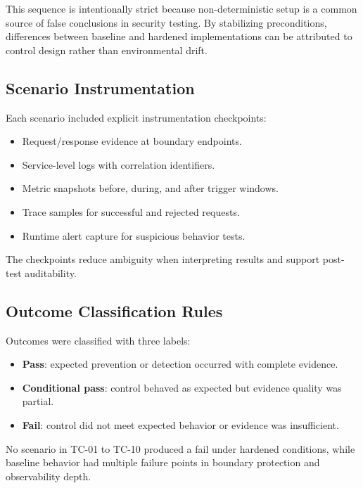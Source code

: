 \documentclass[conference]{IEEEtran}
\begin{document}
This sequence is intentionally strict because non-deterministic setup is a common source of false conclusions in security testing. By stabilizing preconditions, differences between baseline and hardened implementations can be attributed to control design rather than environmental drift.

\subsection{Scenario Instrumentation}
Each scenario included explicit instrumentation checkpoints:
\begin{itemize}
\item Request/response evidence at boundary endpoints.
\item Service-level logs with correlation identifiers.
\item Metric snapshots before, during, and after trigger windows.
\item Trace samples for successful and rejected requests.
\item Runtime alert capture for suspicious behavior tests.
\end{itemize}

The checkpoints reduce ambiguity when interpreting results and support post-test auditability.

\subsection{Outcome Classification Rules}
Outcomes were classified with three labels:
\begin{itemize}
\item \textbf{Pass}: expected prevention or detection occurred with complete evidence.
\item \textbf{Conditional pass}: control behaved as expected but evidence quality was partial.
\item \textbf{Fail}: control did not meet expected behavior or evidence was insufficient.
\end{itemize}

No scenario in TC-01 to TC-10 produced a fail under hardened conditions, while baseline behavior had multiple failure points in boundary protection and observability depth.
\end{document}
